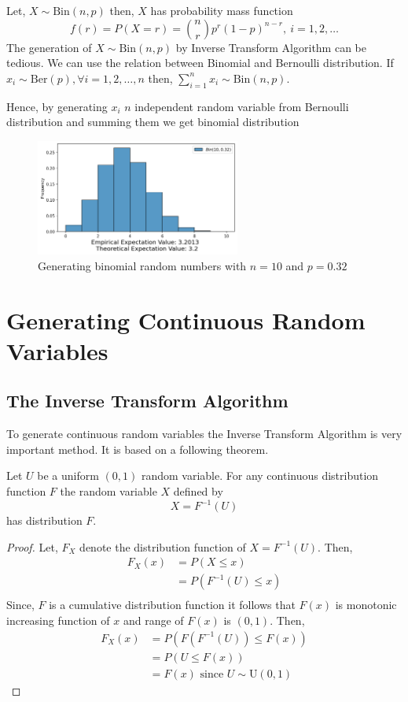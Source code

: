 \begin{example}
    Let, $X\sim \text{Bin}(n,p)$ then,  $X$ has probability mass function
	\[
		f(r) = P(X=r) = {n\choose r}p^{r}(1-p)^{n-r},\  i = 1,2, \ldots
	\]
    The generation of $X\sim \text{Bin}(n,p)$ by Inverse Transform Algorithm can be tedious. We can use the relation between Binomial and Bernoulli distribution.
    If $x_i \sim \text{Ber}(p), \forall i = 1,2, \ldots, n$ then, $\sum_{i=1}^{n} x_i\sim \text{Bin}(n,p)$.

	Hence, by generating $x_i$ $n$ independent random variable from Bernoulli distribution and summing them we get binomial distribution
	\begin{figure}[H]
		\centering
		\includegraphics[width=0.6\textwidth]{images/bin_ITA.png}
		\caption{Generating  binomial random numbers with $n=10$ and  $p=0.32$}
	\end{figure}
\end{example}

\section{Generating Continuous Random Variables}

\subsection{The Inverse Transform Algorithm}
To generate continuous random variables the Inverse Transform Algorithm is very important method. It is based on a following theorem.
\begin{theorem}
	\label{ITA theorem}
	Let $U$ be a uniform  $(0,1)$ random variable. For any continuous distribution function  $F$ the random variable  $X$ defined by
	\[
		X=F^{-1}(U)
	\]
	has distribution $F$.
\end{theorem}
\begin{proof}
	Let, $F_X$ denote the distribution function of  $X=F^{-1}(U)$. Then,
	\begin{align*}
		F_X(x) & = P(X\le x)         \\
		       & = P(F^{-1}(U)\le x) \\
	\end{align*}
	Since, $F$ is a cumulative distribution function it follows that $F(x)$ is monotonic increasing function of  $x$ and range of  $F(x)$ is  $(0,1)$.
	Then,
	\begin{align*}
		F_X(x) & = P\left(F\left(F^{-1}(U)\right)\le F(x)\right) \\
		       & = P(U\le F(x))                                  \\
               & = F(x) \text{ since $U\sim \text{U}(0,1)$ }
	\end{align*}
\end{proof}

